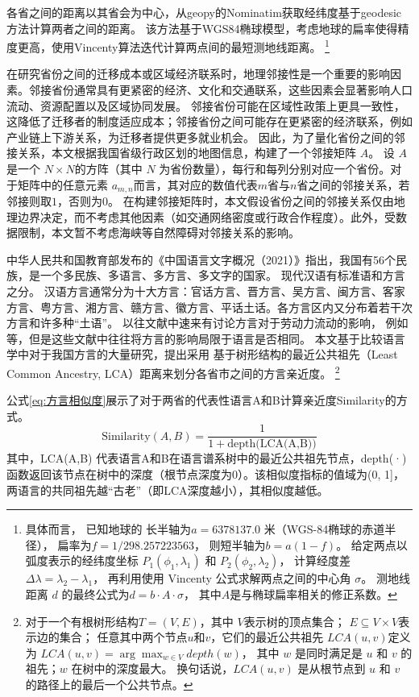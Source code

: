 \documentclass[
  a4paper,
  zihao=-4,
  fontset=mac,
  AutoFakeBold,
  AutoFakeSlant,
  oneside]{ctexbook}
\let\oldfootnote\footnote
\renewcommand{\footnote}[1]{%
  \oldfootnote{\setstretch{1.5}#1}%
}
\begin{document}
各省之间的距离以其省会为中心，从geopy的Nominatim获取经纬度基于geodesic方法计算两者之间的距离。
该方法基于WGS84椭球模型，考虑地球的扁率使得精度更高，使用Vincenty算法迭代计算两点间的最短测地线距离。
\footnote{
具体而言，
已知地球的
长半轴为$a = 6378137.0$ 米（WGS-84椭球的赤道半径），
扁率为$f = 1 / 298.257223563$，
则短半轴为$b = a(1 - f)$。
给定两点以弧度表示的经纬度坐标 $ P_1(\phi_1, \lambda_1) $ 和 $ P_2(\phi_2, \lambda_2) $，
计算经度差$\Delta\lambda = \lambda_2 - \lambda_1$，
再利用使用 Vincenty 公式求解两点之间的中心角 $\sigma$。
测地线距离 $d$ 的最终公式为$d = b \cdot A \cdot \sigma$，
其中$A$是与椭球扁率相关的修正系数。
}

在研究省份之间的迁移成本或区域经济联系时，地理邻接性是一个重要的影响因素。邻接省份通常具有更紧密的经济、文化和交通联系，这些因素会显著影响人口流动、资源配置以及区域协同发展。
邻接省份可能在区域性政策上更具一致性，这降低了迁移者的制度适应成本；邻接省份之间可能存在更紧密的经济联系，例如产业链上下游关系，为迁移者提供更多就业机会。
因此，为了量化省份之间的邻接关系，本文根据我国省级行政区划的地图信息，构建了一个邻接矩阵 $A$。
设 $A$ 是一个 $N \times N$的方阵（其中 $N$ 为省份数量），每行和每列分别对应一个省份。对于矩阵中的任意元素 $a_{m,n}$而言，其对应的数值代表$m$省与$n$省之间的邻接关系，若邻接则取$1$，否则为$0$。
在构建邻接矩阵时，本文假设省份之间的邻接关系仅由地理边界决定，而不考虑其他因素（如交通网络密度或行政合作程度）。此外，受数据限制，本文暂不考虑海峡等自然障碍对邻接关系的影响。


中华人民共和国教育部发布的《中国语言文字概况（2021）》指出，我国有56个民族，是一个多民族、多语言、多方言、多文字的国家。
现代汉语有标准语和方言之分。
汉语方言通常分为十大方言：官话方言、晋方言、吴方言、闽方言、客家方言、粤方言、湘方言、赣方言、徽方言、平话土话。各方言区内又分布着若干次方言和许多种“土语”。
以往文献中速来有讨论方言对于劳动力流动的影响，
例如\textcite{HuangZongYeFangYanDuiShengJiRenKouQianYiDeYingXiang2020,LiQinFangYanPuTongHuaYuZhongGuoLaoDongLiQuYuLiuDong2014}等，但是这些文献中往往将方言的影响局限于语言是否相同。
本文基于比较语言学中对于我国方言的大量研究，提出采用
基于树形结构的最近公共祖先（Least Common Ancestry, LCA）距离来划分各省市之间的方言亲近度。
\footnote{
对于一个有根树形结构$T=(V,E)$，其中
$V$表示树的顶点集合；
$E\subseteq V \times V$表示边的集合；
任意其中两个节点$u$和$v$，它们的最近公共祖先 $LCA(u,v) $定义为
$LCA(u,v)=\arg \max_{w\in V} depth(w)$，
其中 $w$ 是同时满足是 $u$ 和 $v$ 的祖先；$w$ 在树中的深度最大。
换句话说，$LCA(u,v)$ 是从根节点到 $u$ 和 $v$ 的路径上的最后一个公共节点。
}
公式\ref{eq:方言相似度}展示了对于两省的代表性语言A和B计算亲近度Similarity的方式。
\begin{equation} 
\label{eq:方言相似度} 
\text{Similarity}(A,B) = \frac{1}{1+\text{depth(LCA(A,B))}} 
\end{equation}
其中，LCA(A,B) 代表语言A和B在语言谱系树中的最近公共祖先节点，depth(·) 函数返回该节点在树中的深度（根节点深度为0）。该相似度指标的值域为(0, 1]，两语言的共同祖先越“古老”（即LCA深度越小），其相似度越低。
\end{document}

